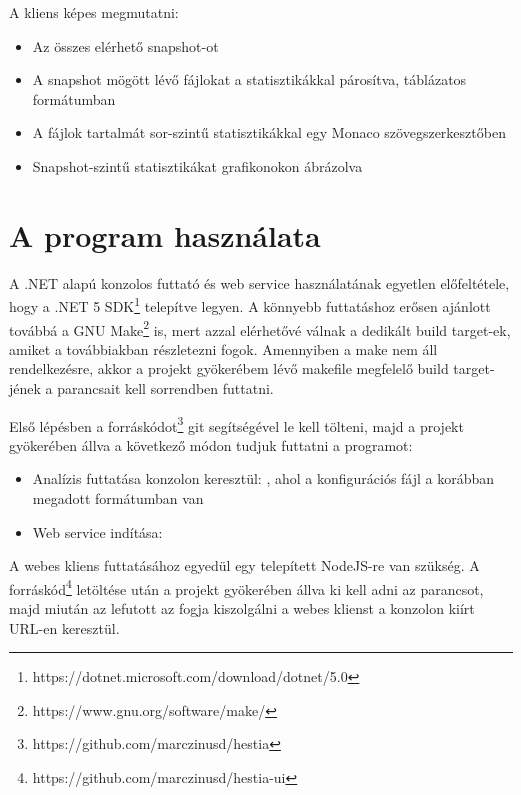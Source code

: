 A kliens képes megmutatni:
\begin{itemize}
    \item Az összes elérhető snapshot-ot
    \item A snapshot mögött lévő fájlokat a statisztikákkal párosítva, táblázatos formátumban
    \item A fájlok tartalmát sor-szintű statisztikákkal egy Monaco szövegszerkesztőben
    \item Snapshot-szintű statisztikákat grafikonokon ábrázolva
\end{itemize}

\section{A program használata}

A .NET alapú konzolos futtató és web service használatának egyetlen előfeltétele, hogy a .NET 5 SDK\footnote{https://dotnet.microsoft.com/download/dotnet/5.0} telepítve legyen. A könnyebb futtatáshoz erősen ajánlott továbbá a GNU Make\footnote{https://www.gnu.org/software/make/} is, mert azzal elérhetővé válnak a dedikált build target-ek, amiket a továbbiakban részletezni fogok. Amennyiben a make nem áll rendelkezésre, akkor a projekt gyökerébem lévő makefile megfelelő build target-jének a parancsait kell sorrendben futtatni.

Első lépésben a forráskódot\footnote{https://github.com/marczinusd/hestia} git segítségével le kell tölteni, majd a projekt gyökerében állva a következő módon tudjuk futtatni a programot:

\begin{itemize}
    \item Analízis futtatása konzolon keresztül: , ahol a konfigurációs fájl a korábban megadott formátumban van
    \item Web service indítása: 
\end{itemize}

A webes kliens futtatásához egyedül egy telepített NodeJS-re van szükség. A forráskód\footnote{https://github.com/marczinusd/hestia-ui} letöltése után a projekt gyökerében állva ki kell adni az  parancsot, majd miután az lefutott az  fogja kiszolgálni a webes klienst a konzolon kiírt URL-en keresztül.
